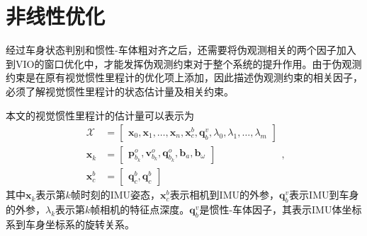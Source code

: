 \section{非线性优化}
经过车身状态判别和惯性-车体粗对齐之后，还需要将伪观测相关的两个因子加入到VIO的窗口优化中，才能发挥伪观测约束对于整个系统的提升作用。由于伪观测约束是在原有视觉惯性里程计的优化项上添加，因此描述伪观测约束的相关因子，必须了解视觉惯性里程计的状态估计量及相关约束。

本文的视觉惯性里程计的估计量可以表示为
\begin{equation}
\begin{aligned}
  \mathcal{X} &= \begin{bmatrix} \symbf{x}_0, \symbf{x}_1, \dots, \symbf{x}_n, \symbf{x}_c^b, \symbf{q}_b^v, \lambda_0, \lambda_1, \dots, \lambda_m \end{bmatrix} \\
  \symbf{x}_k &= \begin{bmatrix} \symbf{p}_{b_{k}}^o, \symbf{v}_{b_{k}}^o, \symbf{q}_{b_{k}}^o, \symbf{b}_a, \symbf{b}_{\omega} \end{bmatrix} \\
  \symbf{x}_c^b &= \begin{bmatrix} \symbf{q}_{c}^b, \symbf{q}_{c}^b \end{bmatrix}
\end{aligned},
\end{equation}
其中$\symbf{x}_k$表示第$k$帧时刻的IMU姿态，$\symbf{x}_c^b$表示相机到IMU的外参，$\symbf{q}_b^v$表示IMU到车身的外参，$\lambda_k$表示第$k$帧相机的特征点深度。$\symbf{q}_b^v$是惯性-车体因子，其表示IMU体坐标系到车身坐标系的旋转关系。

